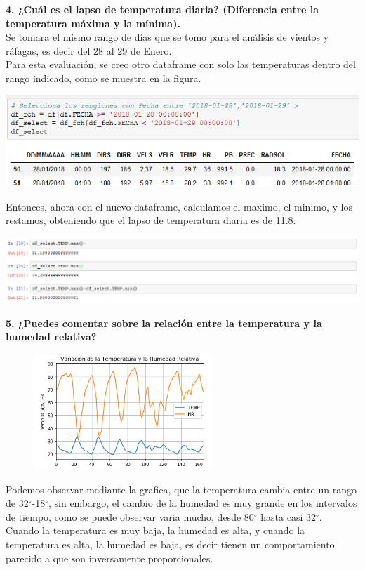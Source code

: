 \documentclass[12pt]{article}
\begin{document}
\noindent\textbf {4. ¿Cuál es el lapso de temperatura diaria? (Diferencia entre la temperatura máxima y la mínima). } \\
Se tomara el mismo rango de días que se tomo para el análisis de vientos y ráfagas, es decir del 28 al 29 de Enero.\\
Para esta evaluación, se creo otro dataframe con solo las temperaturas dentro del rango indicado, como se muestra en la figura. 

\begin{center}
\includegraphics[scale=0.65]{Nuevodf.png}
\end{center}
Entonces, ahora con el nuevo dataframe, calculamos el maximo, el minimo, y los restamos, obteniendo que el lapso de temperatura diaria es de 11.8. 

\begin{center}
\includegraphics[scale=0.6]{diferencia.png}
\end{center}

\noindent\textbf {5. ¿Puedes comentar sobre la relación entre la temperatura y la humedad relativa?} \\
\begin{figure}
    \centering
    \includegraphics[width=0.6\textwidth]{VarTempHum.png}
\end{figure}
Podemos observar mediante la grafica, que la temperatura cambia entre un rango de 32$^{\circ}$-18$^{\circ}$, sin embargo, el cambio de la humedad es muy grande en los intervalos de tiempo, como se puede observar varia mucho, desde 80$^{\circ}$ hasta casi 32$^{\circ}$. \\ 
Cuando la temperatura es muy baja, la humedad es alta, y cuando la temperatura es alta, la humedad es baja, es decir tienen un comportamiento parecido a que son inversamente proporcionales. \\ \\ 
\end{document}
